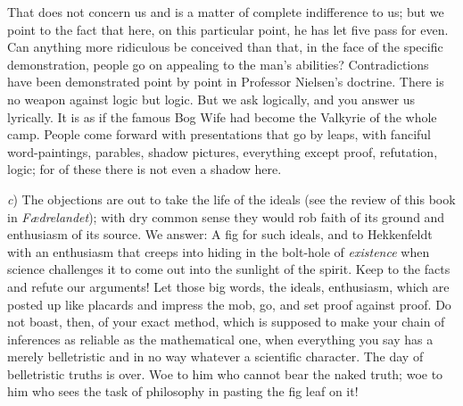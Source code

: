 \documentclass[12pt,a4paper,openany]{book}
\newcommand{\opage}[1]{\marginnote{\footnotesize\textit{[#1]}}}
\begin{document}
That does not concern us and is a matter of complete indifference to us;
but we point to the fact that here, on this particular point, he
\opage{95}has let five pass for even. %
Can anything more ridiculous be conceived than that, in the face of
the specific demonstration, people go on appealing to the man's
abilities? Contradictions have been demonstrated point by point in
Professor Nielsen's doctrine. There is no weapon against logic but
logic. But we ask logically, and you answer us lyrically. It is as if
the famous Bog Wife had become the Valkyrie of the whole camp. %
People come forward with presentations that go by leaps, with fanciful
word-paintings, parables, shadow pictures, everything except proof,
refutation, logic; for of these there is not even a shadow here.

\emph{c}) The objections are out to take the life of the ideals (see the
review of this book in \emph{Fædrelandet}); with dry common sense they
would rob faith of its ground and enthusiasm of its source. We answer:
A fig for such ideals, and to Hekkenfeldt with an enthusiasm that creeps
into hiding in the bolt-hole of \emph{existence} when science challenges it
to come out into the sunlight of the spirit. Keep to the facts and refute
our arguments! Let those big words, the ideals, enthusiasm, which are
posted up like placards and impress the mob, go, and set proof against
proof. Do not boast, then, of your exact method, which is supposed to
make your chain of inferences as reliable as the mathematical one, when
everything you say has a merely belletristic and in no way whatever a
scientific character. The day of belletristic truths is over. Woe to him
who cannot bear the naked truth; woe to him who sees the task of
philosophy in pasting the fig leaf on it!
\end{document}
